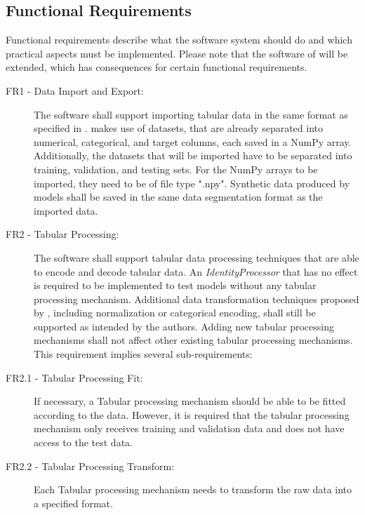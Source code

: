 \subsection*{Functional Requirements}
\label{sec:func_requirements}
Functional requirements describe what the software system should do and which practical aspects must be implemented.
Please note that the software of \cite{kotelnikov2022TabDDPMModellingTabular} will be extended, which has consequences for certain functional requirements.

\begin{description}
	\item[FR1 - Data Import and Export:]
		The software shall support importing tabular data in the same format as specified in \cite{kotelnikov2022TabDDPMModellingTabular}.
		\textcite{kotelnikov2022TabDDPMModellingTabular} makes use of datasets, that are already separated into numerical, categorical, and target columns, each saved in a NumPy \cite{harris2020array} array.
		Additionally, the datasets that will be imported have to be separated into training, validation, and testing sets.
		For the NumPy arrays to be imported, they need to be of file type ".npy".
		Synthetic data produced by models shall be saved in the same data segmentation format as the imported data.

	\item[FR2 - Tabular Processing:]
		The software shall support tabular data processing techniques that are able to encode and decode tabular data.
		An \textit{IdentityProcessor} that has no effect is required to be implemented to test models without any tabular processing mechanism.
		Additional data transformation techniques proposed by \cite{kotelnikov2022TabDDPMModellingTabular}, including normalization or categorical encoding, shall still be supported as intended by the authors.
		Adding new tabular processing mechanisms shall not affect other existing tabular processing mechanisms. This requirement implies several sub-requirements: 

		\item[FR2.1 - Tabular Processing Fit:]
		If necessary, a Tabular processing mechanism should be able to be fitted according to the data.
		However, it is required that the tabular processing mechanism only receives training and validation data and does not have access to the test data.

		\item[FR2.2 - Tabular Processing Transform:]
		Each Tabular processing mechanism needs to transform the raw data into a specified format.


\end{description}
